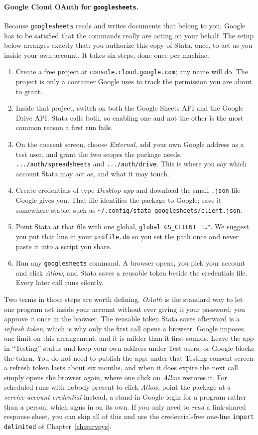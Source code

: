 \documentclass[
    a4paper,
    fontsize=10pt,
    twoside=true,
    numbers=noenddot,
]{kaobook}
\begin{document}
\paragraph{Google Cloud OAuth for \texttt{googlesheets}.} Because \texttt{googlesheets} reads and writes documents that belong to you, Google has to be satisfied that the commands really are acting on your behalf. The setup below arranges exactly that: you authorize this copy of Stata, once, to act as you inside your own account. It takes six steps, done once per machine.
\begin{enumerate}
    \item Create a free project at \texttt{console.cloud.google.com}; any name will do. The project is only a container Google uses to track the permission you are about to grant.
    \item Inside that project, switch on both the Google Sheets API and the Google Drive API. Stata calls both, so enabling one and not the other is the most common reason a first run fails.
    \item On the consent screen, choose \emph{External}, add your own Google address as a test user, and grant the two scopes the package needs, \texttt{.../auth/spreadsheets} and \texttt{.../auth/drive}. This is where you say which account Stata may act as, and what it may touch.
    \item Create credentials of type \emph{Desktop app} and download the small \texttt{.json} file Google gives you. That file identifies the package to Google; save it somewhere stable, such as \texttt{\~{}/.config/stata-googlesheets/client.json}.
    \item Point Stata at that file with one global, \texttt{global GS\_CLIENT "\ldots"}. We suggest you put that line in your \texttt{profile.do} so you set the path once and never paste it into a script you share.
    \item Run any \texttt{googlesheets} command. A browser opens, you pick your account and click \emph{Allow}, and Stata saves a reusable token beside the credentials file. Every later call runs silently.
\end{enumerate}
Two terms in those steps are worth defining. \emph{OAuth} is the standard way to let one program act inside your account without ever giving it your password; you approve it once in the browser. The reusable token Stata saves afterward is a \emph{refresh token}, which is why only the first call opens a browser. Google imposes one limit on this arrangement, and it is milder than it first sounds. Leave the app in \enquote{Testing} status and keep your own address under Test users, or Google blocks the token. You do not need to publish the app: under that Testing consent screen a refresh token lasts about six months, and when it does expire the next call simply opens the browser again, where one click on \emph{Allow} restores it. For scheduled runs with nobody present to click \emph{Allow}, point the package at a \emph{service-account credential} instead, a stand-in Google login for a program rather than a person, which signs in on its own. If you only need to \emph{read} a link-shared response sheet, you can skip all of this and use the credential-free one-line \texttt{import delimited} of Chapter~\ref{ch:surveys}.
\end{document}
